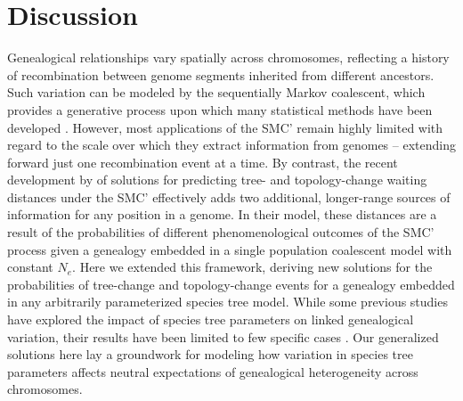 \documentclass[11pt]{article}
\begin{document}
\section{Discussion}

Genealogical relationships vary spatially across chromosomes, reflecting 
a history of recombination between genome segments inherited from 
different ancestors. Such variation can be modeled by the sequentially 
Markov coalescent, which provides a generative process upon which 
many statistical methods have been developed \citep{mcvean2005approximating, spence_inference_2018}.
However, most applications of the SMC' remain highly limited with regard to 
the scale over which they extract information from genomes -- extending forward 
just one recombination event at a time. 
By contrast, the recent development 
by \citet{deng_distribution_2021}
of solutions for predicting 
tree- and topology-change waiting distances under the SMC' 
effectively adds two additional, longer-range sources of information for 
any position in a genome. 
In their model, these distances are a 
result of the probabilities of different phenomenological outcomes of the 
SMC' process given a genealogy embedded in a single population coalescent
model with constant $N_e$.
Here we extended this framework, deriving new solutions for the probabilities 
of tree-change and topology-change events for a genealogy embedded 
in any arbitrarily parameterized species tree model. 
While some previous studies have explored the impact of species tree parameters
on linked genealogical variation, their results have been limited to few specific
cases \citep[e.g.,][]{slatkin2006concordance}.
Our generalized solutions here lay a groundwork for 
modeling how variation in species tree parameters 
affects neutral expectations of genealogical heterogeneity across chromosomes.
\end{document}
